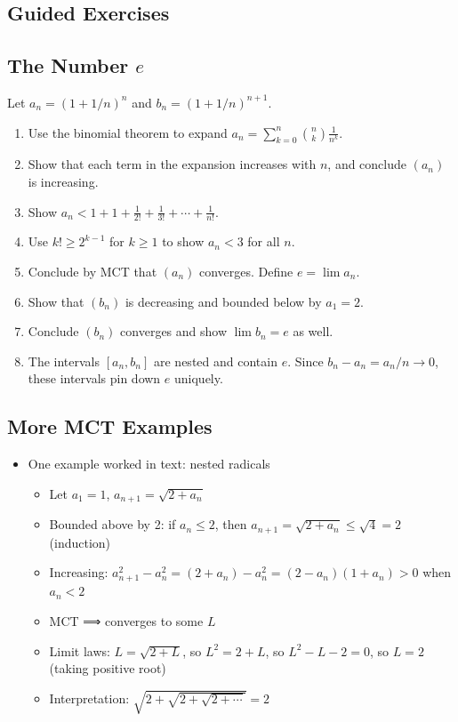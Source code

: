 \documentclass[
  10pt,
  letterpaper,
]{scrbook}
\providecommand{\tightlist}{%
  \setlength{\itemsep}{0pt}\setlength{\parskip}{0pt}}
\begin{document}
\subsection{Guided Exercises}\label{guided-exercises-4}

\subsection{\texorpdfstring{The Number
\(e\)}{The Number e}}\label{the-number-e-1}

Let \(a_n = (1 + 1/n)^n\) and \(b_n = (1 + 1/n)^{n+1}\).

\begin{enumerate}
\def\labelenumi{(\alph{enumi})}
\item
  Use the binomial theorem to expand
  \(a_n = \sum_{k=0}^{n} \binom{n}{k} \frac{1}{n^k}\).
\item
  Show that each term in the expansion increases with \(n\), and
  conclude \((a_n)\) is increasing.
\item
  Show
  \(a_n < 1 + 1 + \frac{1}{2!} + \frac{1}{3!} + \cdots + \frac{1}{n!}\).
\item
  Use \(k! \geq 2^{k-1}\) for \(k \geq 1\) to show \(a_n < 3\) for all
  \(n\).
\item
  Conclude by MCT that \((a_n)\) converges. Define \(e = \lim a_n\).
\item
  Show that \((b_n)\) is decreasing and bounded below by \(a_1 = 2\).
\item
  Conclude \((b_n)\) converges and show \(\lim b_n = e\) as well.
\item
  The intervals \([a_n, b_n]\) are nested and contain \(e\). Since
  \(b_n - a_n = a_n/n \to 0\), these intervals pin down \(e\) uniquely.
\end{enumerate}

\subsection{More MCT Examples}\label{more-mct-examples}

\begin{itemize}
\tightlist
\item
  One example worked in text: nested radicals

  \begin{itemize}
  \tightlist
  \item
    Let \(a_1 = 1\), \(a_{n+1} = \sqrt{2 + a_n}\)
  \item
    Bounded above by 2: if \(a_n \leq 2\), then
    \(a_{n+1} = \sqrt{2 + a_n} \leq \sqrt{4} = 2\) (induction)
  \item
    Increasing:
    \(a_{n+1}^2 - a_n^2 = (2 + a_n) - a_n^2 = (2 - a_n)(1 + a_n) > 0\)
    when \(a_n < 2\)
  \item
    MCT ⟹ converges to some \(L\)
  \item
    Limit laws: \(L = \sqrt{2 + L}\), so \(L^2 = 2 + L\), so
    \(L^2 - L - 2 = 0\), so \(L = 2\) (taking positive root)
  \item
    Interpretation: \(\sqrt{2 + \sqrt{2 + \sqrt{2 + \cdots}}} = 2\)
  \end{itemize}
\end{itemize}
\end{document}
